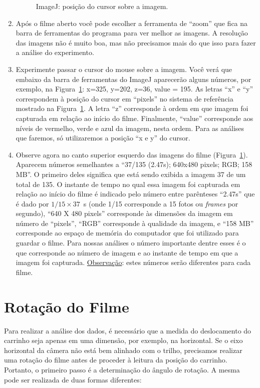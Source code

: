 \begin{enumerate}
\begin{figure}[t!]
\begin{center}
\caption{\label{fig:exMovie} ImageJ: posição do cursor sobre a imagem.}
\vspace{-0.6cm}
\end{center}
\end{figure}

\item Após o filme aberto você pode escolher a ferramenta de “zoom” que fica na barra de ferramentas do programa para ver melhor as imagens. A resolução das imagens não é muito boa, mas não precisamos mais do que isso para fazer a análise do experimento.
\item Experimente passar o cursor do mouse sobre a imagem. Você verá que embaixo da barra de ferramentas do ImageJ aparecerão alguns números, por exemplo, na Figura~\ref{fig:exMovie}: x=325, y=202, z=36, value = 195. As letras “x” e “y” correspondem à posição do cursor em “pixels” no sistema de referência mostrado na Figura~\ref{fig:exMovie}. A letra “z” corresponde à ordem em que imagem foi capturada em relação ao início do filme. Finalmente, “value” corresponde aos níveis de vermelho, verde e azul da imagem, nesta ordem. Para as análises que faremos, só utilizaremos a posição “x e y” do cursor.
\item Observe agora no canto superior esquerdo das imagens do filme (Figura~\ref{fig:exMovie}). Aparecem números semelhantes a “37/135 (2.47s); 640x480 pixels; RGB; 158 MB”. O primeiro deles significa que está sendo exibida a imagem 37 de um total de 135. O instante de tempo no qual essa imagem foi capturada em relação ao início do filme é indicado pelo número entre parênteses “2.47s” que é dado por $1/15 \times 37$~s (onde 1/15 corresponde a 15 fotos ou {\it frames}  por segundo), “640 X 480 pixels” corresponde às dimensões da imagem em número de “pixels”, “RGB” corresponde à qualidade da imagem, e “158 MB” corresponde ao espaço de memória do computador que foi utilizado para guardar o filme. Para nossas análises o número importante dentre esses é o que corresponde ao número de imagem e ao instante de tempo em que a imagem foi capturada. \underline{Observação}: estes números serão diferentes para cada filme.
\end{enumerate}


\section*{Rotação do Filme}

Para realizar a análise dos dados, é necessário que a medida do deslocamento do carrinho seja apenas em uma dimensão, por exemplo, na horizontal.  Se o eixo horizontal da câmera não está bem alinhado com o trilho, precisamos realizar uma rotação do filme antes de proceder à leitura da posição do carrinho. Portanto, o primeiro passo é a determinação do ângulo de rotação.  A mesma pode ser realizada de duas formas diferentes:

